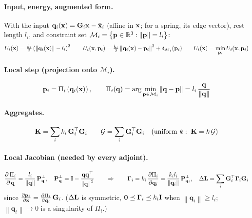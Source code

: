 \paragraph{Input, energy, augmented form.} With the input $\mathbf{q}_i(\mathbf{x}) = \mathbf{G}_i\mathbf{x} - \bar{\mathbf{x}}_i$ (affine in $\mathbf{x}$; for a spring, its edge vector), rest length $l_i$, and constraint set $\mathcal{M}_i = \left\{\mathbf{p} \in \mathbb{R}^3 : \|\mathbf{p}\| = l_i\right\}$:
\begin{equation*}
    U_i(\mathbf{x}) = \tfrac{k_i}{2}\left(\left\|\mathbf{q}_i(\mathbf{x})\right\| - l_i\right)^2
    \qquad
    U_i(\mathbf{x}, \mathbf{p}_i) = \tfrac{k_i}{2}\left\|\mathbf{q}_i(\mathbf{x}) - \mathbf{p}_i\right\|^2 + \delta_{\mathcal{M}_i}(\mathbf{p}_i)
    \qquad
    U_i(\mathbf{x}) = \min_{\mathbf{p}_i} U_i(\mathbf{x}, \mathbf{p}_i)
\end{equation*}

\paragraph{Local step (projection onto $\mathcal{M}_i$).}
\begin{equation*}
    \mathbf{p}_i = \Pi_i\left(\mathbf{q}_i(\mathbf{x})\right),
    \qquad
    \Pi_i(\mathbf{q}) = \arg\min_{\mathbf{p}\in\mathcal{M}_i}\left\|\mathbf{q} - \mathbf{p}\right\| = l_i\,\frac{\mathbf{q}}{\left\|\mathbf{q}\right\|}
\end{equation*}

\paragraph{Aggregates.}
\begin{equation*}
    \mathbf{K} = \sum_i k_i\,\mathbf{G}_i^\top\mathbf{G}_i
    \qquad
    \mathcal{G} = \sum_i \mathbf{G}_i^\top\mathbf{G}_i
    \quad(\text{uniform } k:\; \mathbf{K} = k\,\mathcal{G})
\end{equation*}

\paragraph{Local Jacobian (needed by every adjoint).}
\begin{equation*}
    \dfrac{\partial\, \Pi_i}{\partial\, \mathbf{q}} = \frac{l_i}{\left\|\mathbf{q}\right\|}\,\mathbf{P}_{\mathbf{q}}^\perp,
    \quad
    \mathbf{P}_{\mathbf{q}}^\perp = \mathbf{I} - \frac{\mathbf{q}\mathbf{q}^\top}{\left\|\mathbf{q}\right\|^2}
    \qquad\Rightarrow\qquad
    \boldsymbol{\Gamma}_i = k_i\,\frac{\partial \Pi_i}{\partial \mathbf{q}_i} = \frac{k_i l_i}{\left\|\mathbf{q}_i\right\|}\,\mathbf{P}_{\mathbf{q}_i}^\perp,
    \quad
    \Delta\mathbf{L} = \sum_i \mathbf{G}_i^\top\boldsymbol{\Gamma}_i\mathbf{G}_i
\end{equation*}
since $\frac{\partial \mathbf{p}_i}{\partial \mathbf{x}} = \frac{\partial \Pi_i}{\partial \mathbf{q}_i}\,\mathbf{G}_i$. ($\Delta\mathbf{L}$ is symmetric, $\mathbf{0} \preceq \boldsymbol{\Gamma}_i \preceq k_i\mathbf{I}$ when $\left\|\mathbf{q}_i\right\| \ge l_i$; $\left\|\mathbf{q}_i\right\| \to 0$ is a singularity of $\Pi_i$.)

